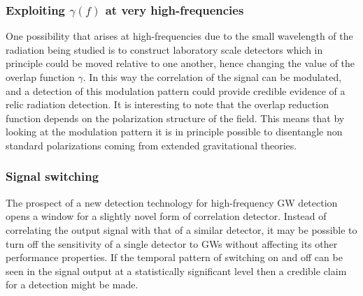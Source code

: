 \documentclass[11pt,a4paper]{article}
\begin{document}
\subsubsection{Exploiting $\gamma(f)$ at very high-frequencies}

One possibility that arises at high-frequencies due to the small wavelength of the radiation being studied is to construct laboratory scale detectors which in principle could be moved relative to one another, hence changing the value of the overlap function $\gamma$. In this way the correlation of the signal can be modulated, and a detection of this modulation pattern could provide credible evidence of a relic radiation detection. It is interesting to note that the overlap reduction function depends on the polarization structure of the field. This means that by looking at the modulation pattern it is in principle possible to disentangle non standard polarizations coming from extended gravitational theories.

\subsubsection{Signal switching}
\label{subsec:switch}

The prospect of a new detection technology for high-frequency GW detection opens a window for a slightly novel form of correlation detector. Instead of correlating the output signal with that of a similar detector, it may be possible to turn off the sensitivity of a single detector to GWs without affecting its other performance properties. If the temporal pattern of switching on and off can be seen in the signal output at a statistically significant level then a credible claim for a detection might be made.
\end{document}

